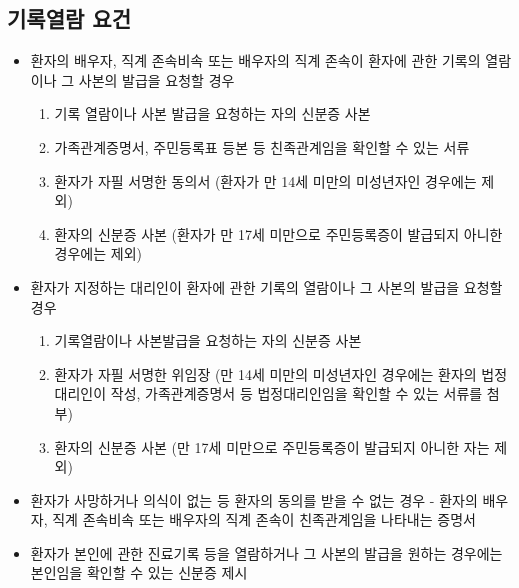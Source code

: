 \subsection{기록열람 요건}
\begin{itemize}\tightlist
\item 환자의 배우자, 직계 존속\cntrdot{}비속 또는 배우자의 직계 존속이 환자에 관한 기록의 열람이나 그 사본의 발급을 요청할 경우 
	\begin{mdframed}[linecolor=blue,middlelinewidth=2]
	\begin{enumerate}\tightlist
	\item 기록 열람이나 사본 발급을 요청하는 자의 신분증 사본
	\item 가족관계증명서, 주민등록표  등본 등 친족관계임을 확인할 수 있는 서류
	\item 환자가 자필 서명한 동의서 (환자가 만 14세 미만의 미성년자인 경우에는 제외)
	\item 환자의 신분증 사본 (환자가 만 17세 미만으로 주민등록증이 발급되지 아니한 경우에는 제외)
	\end{enumerate}
	\end{mdframed}
\item 환자가 지정하는 대리인이 환자에 관한 기록의 열람이나 그 사본의 발급을 요청할 경우
	\begin{mdframed}[linecolor=blue,middlelinewidth=2]
	\begin{enumerate}\tightlist
	\item  기록열람이나 사본발급을 요청하는 자의 신분증 사본
	\item  환자가 자필 서명한 위임장 (만 14세 미만의 미성년자인 경우에는 환자의 법정대리인이 작성, 가족관계증명서 등 법정대리인임을 확인할 수 있는 서류를 첨부)
	\item  환자의 신분증 사본 (만 17세 미만으로 주민등록증이 발급되지 아니한 자는 제외)
	\end{enumerate}
	\end{mdframed}	
\item 환자가 사망하거나 의식이 없는 등 환자의 동의를 받을 수 없는 경우 - 환자의 배우자, 직계 존속\cntrdot{}비속 또는 배우자의 직계 존속이 친족관계임을 나타내는 증명서 
\item 환자가 본인에 관한 진료기록 등을 열람하거나 그 사본의 발급을 원하는 경우에는 본인임을 확인할 수 있는 신분증 제시		
\end{itemize}

